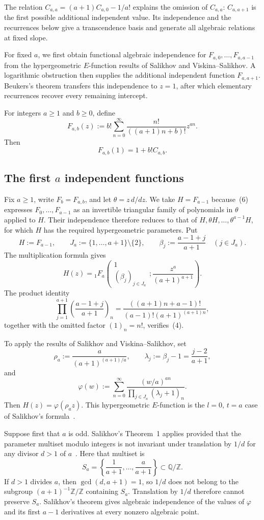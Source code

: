 \documentclass[12pt]{article}
\begin{document}
The relation $C_{a,a}=(a+1)C_{a,0}-1/a!$ explains the omission of $C_{a,a}$: $C_{a,a+1}$ is the first possible additional independent value. Its independence and the recurrences below give a transcendence basis and generate all algebraic relations at fixed slope.

For fixed $a$, we first obtain functional algebraic independence for $F_{a,0},\ldots,F_{a,a-1}$ from the hypergeometric $E$-function results of Salikhov and Viskina--Salikhov. A logarithmic obstruction then supplies the additional independent function $F_{a,a+1}$. Beukers's theorem transfers this independence to $z=1$, after which elementary recurrences recover every remaining intercept.

For integers $a\geq1$ and $b\geq0$, define
\[
F_{a,b}(z):=b!\sum_{n=0}^{\infty}
\frac{n!}{((a+1)n+b)!}z^{an}.
\tag{2}
\]
Then
\[
F_{a,b}(1)=1+b!C_{a,b}.
\tag{3}
\]

\subsection{The first \texorpdfstring{$a$}{a} independent functions}

Fix $a\geq1$, write $F_b=F_{a,b}$, and let $\theta=z\,d/dz$. We take $H=F_{a-1}$ because~(6) expresses $F_0,\ldots,F_{a-1}$ as an invertible triangular family of polynomials in $\theta$ applied to $H$. Their independence therefore reduces to that of $H,\theta H,\ldots,\theta^{a-1}H$, for which $H$ has the required hypergeometric parameters. Put
\[
H:=F_{a-1},
\qquad
J_a:=\{1,\ldots,a+1\}\setminus\{2\},
\qquad
\beta_j:=\frac{a-1+j}{a+1}\quad(j\in J_a).
\]
The multiplication formula gives
\[
H(z)={}_1F_a\!\left(
\begin{matrix}1\\(\beta_j)_{j\in J_a}\end{matrix};
\frac{z^a}{(a+1)^{a+1}}
\right).
\tag{4}
\]
The product identity
\[
\prod_{j=1}^{a+1}
\left(\frac{a-1+j}{a+1}\right)_n
=\frac{((a+1)n+a-1)!}{(a-1)!(a+1)^{(a+1)n}},
\]
together with the omitted factor $(1)_n=n!$, verifies~(4).

To apply the results of Salikhov and Viskina--Salikhov, set
\[
\rho_a:=\frac{a}{(a+1)^{(a+1)/a}},
\qquad
\lambda_j:=\beta_j-1=\frac{j-2}{a+1},
\]
and
\[
\varphi(w):=\sum_{n=0}^{\infty}
\frac{(w/a)^{an}}
{\displaystyle\prod_{j\in J_a}(\lambda_j+1)_n}.
\]
Then $H(z)=\varphi(\rho_a z)$. This hypergeometric $E$-function is the $l=0$, $t=a$ case of Salikhov's formula~\cite[eq.~(1)]{salikhov}.

Suppose first that $a$ is odd. Salikhov's Theorem~1 applies provided that the parameter multiset modulo integers is not invariant under translation by $1/d$ for any divisor $d>1$ of $a$~\cite[Theorem~1]{salikhov}. Here that multiset is
\[
S_a=\left\{\frac1{a+1},\ldots,\frac a{a+1}\right\}\subset\mathbb Q/\mathbb Z.
\]
If $d>1$ divides $a$, then $\gcd(d,a+1)=1$, so $1/d$ does not belong to the subgroup $(a+1)^{-1}\mathbb Z/\mathbb Z$ containing $S_a$. Translation by $1/d$ therefore cannot preserve $S_a$. Salikhov's theorem gives algebraic independence of the values of $\varphi$ and its first $a-1$ derivatives at every nonzero algebraic point.
\end{document}
